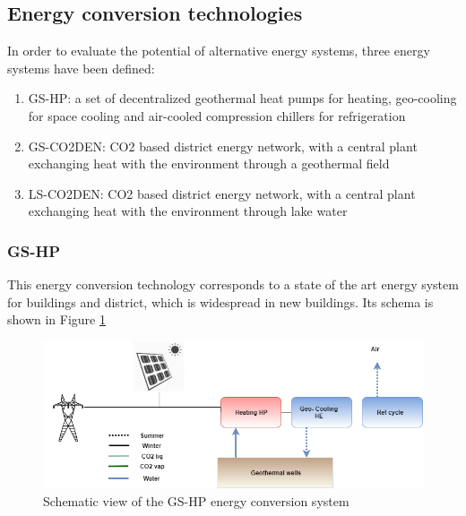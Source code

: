 \documentclass{article}
\begin{document}
%



\subsection{Energy conversion technologies}

In order to evaluate the potential of alternative energy systems, three energy systems have been defined:
\begin{enumerate}
	\item GS-HP: a set of decentralized geothermal heat pumps for heating, geo-cooling for space cooling and air-cooled compression chillers for refrigeration
	\item GS-CO2DEN: CO2 based district energy network, with a central plant exchanging heat with the environment through a geothermal field
	\item LS-CO2DEN: CO2 based district energy network, with a central plant exchanging heat with the environment through lake water
\end{enumerate}

\subsubsection{GS-HP}
This energy conversion technology corresponds to a state of the art energy system for buildings and district, which is widespread in new buildings. Its schema is shown in Figure \ref{fig:energyschemaref}

\begin{figure}[tph]
	\centering
	\includegraphics[width=1\linewidth]{Images/energy_schema_ref}
	\caption{Schematic view of the GS-HP energy conversion system}
	\label{fig:energyschemaref}
\end{figure}
\end{document}

